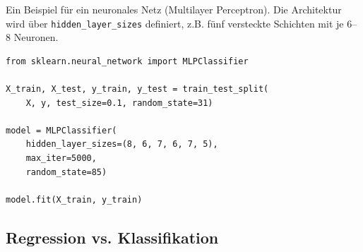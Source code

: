 \begin{contentbox}
Ein Beispiel für ein neuronales Netz (Multilayer Perceptron). Die Architektur wird über \texttt{hidden\_layer\_sizes} definiert, z.B. fünf versteckte Schichten mit je 6–8 Neuronen. 
\end{contentbox}
\begin{codebox}
\begin{lstlisting}[style=CodeExpert]
from sklearn.neural_network import MLPClassifier

X_train, X_test, y_train, y_test = train_test_split(
    X, y, test_size=0.1, random_state=31)

model = MLPClassifier(
    hidden_layer_sizes=(8, 6, 7, 6, 7, 5),
    max_iter=5000,
    random_state=85)

model.fit(X_train, y_train)
\end{lstlisting}
\end{codebox}

\subsection{Regression vs. Klassifikation}\label{sec:08-ml-typen}
\begin{contentbox}
\begin{factlist}
\end{factlist}
\end{contentbox}

